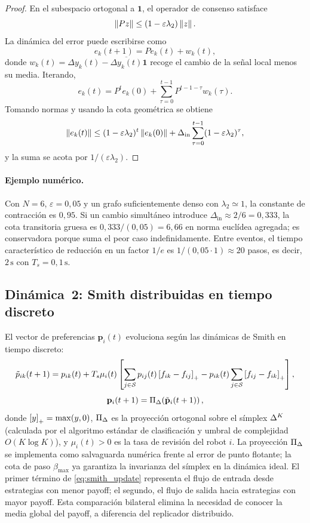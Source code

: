 \begin{proof}
En el subespacio ortogonal a $\mathbf{1}$, el operador de consenso satisface
\[
  \left\|Pz\right\|\le (1-\varepsilon\lambda_2)\left\|z\right\|.
\]
La dinámica del error puede escribirse como
\[
  e_k(t+1)=Pe_k(t)+w_k(t),
\]
donde $w_k(t)=\Delta y_k(t)-\overline{\Delta y_k(t)}\mathbf{1}$ recoge el cambio de
la señal local menos su media. Iterando,
\[
  e_k(t)=P^te_k(0)+\sum_{\tau=0}^{t-1}P^{t-1-\tau}w_k(\tau).
\]
Tomando normas y usando la cota geométrica se obtiene
\[
  \left\|e_k(t)\right\|
  \le
  (1-\varepsilon\lambda_2)^t\left\|e_k(0)\right\|
  +
  \Delta_{\mathrm{in}}
  \sum_{\tau=0}^{t-1}(1-\varepsilon\lambda_2)^\tau,
\]
y la suma se acota por $1/(\varepsilon\lambda_2)$.
\end{proof}

\paragraph{Ejemplo numérico.}
Con $N=6$, $\varepsilon=0{,}05$ y un grafo suficientemente denso con
$\lambda_2\simeq1$, la constante de contracción es $0{,}95$. Si un cambio simultáneo
introduce $\Delta_{\mathrm{in}}\approx2/6=0{,}333$, la cota transitoria gruesa es
$0{,}333/(0{,}05)=6{,}66$ en norma euclídea agregada; es conservadora porque suma el
peor caso indefinidamente. Entre eventos, el tiempo característico de reducción en un
factor $1/e$ es $1/(0{,}05\cdot1)\approx20$ pasos, es decir, $2\,\text{s}$ con
$T_s=0{,}1\,\text{s}$.

\subsection{Dinámica~2: Smith distribuidas en tiempo discreto}
\label{subsec:smith}

El vector de preferencias $\mathbf{p}_i(t)$ evoluciona según las dinámicas de
Smith en tiempo discreto:
\begin{equation}
  \tilde{p}_{ik}(t+1) = p_{ik}(t) + T_s \mu_i(t) \left[
    \sum_{j \in \mathcal{S}} p_{ij}(t)\left[f_{ik} - f_{ij}\right]_{+}
    - p_{ik}(t) \sum_{j \in \mathcal{S}} \left[f_{ij} - f_{ik}\right]_{+}
  \right],
  \label{eq:smith_update}
\end{equation}
\begin{equation}
  \mathbf{p}_i(t+1) = \Pi_{\Delta}\!\left(\tilde{\mathbf{p}}_i(t+1)\right),
  \label{eq:proyeccion}
\end{equation}
donde $\left[y\right]_{+} = \max(y, 0)$, $\Pi_{\Delta}$ es la proyección ortogonal sobre
el símplex $\Delta^K$ (calculada por el algoritmo estándar de clasificación
y umbral de complejidad $O(K\log K)$), y $\mu_i(t) > 0$ es la tasa de revisión del robot $i$.
La proyección $\Pi_{\Delta}$ se implementa como salvaguarda numérica frente al
error de punto flotante; la cota de paso $\beta_{\max}$ ya garantiza la invarianza
del símplex en la dinámica ideal.
El primer término de \eqref{eq:smith_update} representa el flujo de entrada desde
estrategias con menor payoff; el segundo, el flujo de salida hacia estrategias con
mayor payoff. Esta comparación bilateral elimina la necesidad de conocer la media
global del payoff, a diferencia del replicador distribuido.

